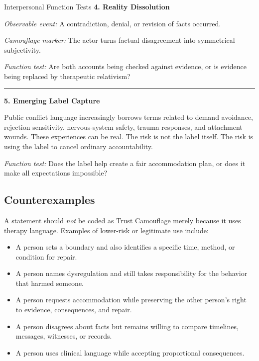 \documentclass[11pt, letterpaper]{article}
\newcommand{\term}[1]{\textbf{#1}}
\begin{document}
\begin{frameworkbox}{Interpersonal Function Tests}
\term{4. Reality Dissolution}

\textit{Observable event:} A contradiction, denial, or revision of facts occurred.

\textit{Camouflage marker:} The actor turns factual disagreement into symmetrical subjectivity.

\textit{Function test:} Are both accounts being checked against evidence, or is evidence being replaced by therapeutic relativism?

\vspace{0.5em}\hrule\vspace{0.7em}

\term{5. Emerging Label Capture}

Public conflict language increasingly borrows terms related to demand avoidance, rejection sensitivity, nervous-system safety, trauma responses, and attachment wounds. These experiences can be real. The risk is not the label itself. The risk is using the label to cancel ordinary accountability.

\textit{Function test:} Does the label help create a fair accommodation plan, or does it make all expectations impossible?
\end{frameworkbox}

\subsection{Counterexamples}

A statement should \textit{not} be coded as Trust Camouflage merely because it uses therapy language. Examples of lower-risk or legitimate use include:

\begin{itemize}
    \item A person sets a boundary and also identifies a specific time, method, or condition for repair.
    \item A person names dysregulation and still takes responsibility for the behavior that harmed someone.
    \item A person requests accommodation while preserving the other person's right to evidence, consequences, and repair.
    \item A person disagrees about facts but remains willing to compare timelines, messages, witnesses, or records.
    \item A person uses clinical language while accepting proportional consequences.
\end{itemize}
\end{document}
